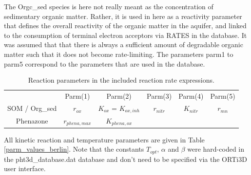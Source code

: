 The {\color{blue}Orgc\_sed} species is here not 
really meant as the concentration of sedimentary organic matter. 
Rather, it is used in here as a reactivity parameter that defines the 
overall reactivity of the organic matter in the aquifer, and linked to the 
consumption of terminal electron acceptors via {\color{blue}RATES} in the database. 
It was assumed that that there is always a sufficient amount of degradable 
organic matter such that it does not 
become rate-limiting. The parameters {\color{blue}parm1} to {\color{blue}parm5} 
correspond to the parameters that are used in the database. 

\begin{table}[b]
\caption{Reaction parameters in the included reaction rate expressions.}
\begin{center}
\begin{tabular}{cccccc}
\toprule
                 & Parm(1) & Parm(2)                  & Parm(3)    & Parm(4)     & Parm(5)        \\
 SOM / Org\_sed  & $r_{ox}$ & $K_{ox}$ = $K_{ox,inh}$  & $r_{nitr}$ &  $K_{nitr}$ & $r_{mn}$ \\
 Phenazone       & $r_{phena,max}$ & $K_{phena,ox}$        &         &         &          \\
 \bottomrule
\end{tabular}
\label{parms_berlin}
\end{center}
\end{table}

All kinetic reaction and temperature parameters are given 
in Table \ref{parm_values_berlin}. 
Note that the constants $T_{opt}$, $\alpha$ and $\beta$ 
were hard-coded in the {\color{blue}pht3d\_database.dat} database 
and don't need to be specified via the ORTi3D user interface.


